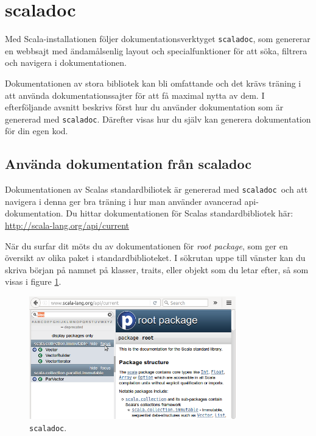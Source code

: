 \section{scaladoc}
\newcommand{\scaladoc}{\texttt{scaladoc}}

Med Scala-installationen följer dokumentationsverktyget \scaladoc, som genererar en webbsajt med ändamålsenlig layout och specialfunktioner för att söka, filtrera och navigera i dokumentationen. 

Dokumentationen av stora bibliotek kan bli omfattande och det krävs träning i att använda dokumentationssajter för att få maximal nytta av dem. I efterföljande avsnitt beskrivs först hur du använder dokumentation som är genererad med \scaladoc. Därefter visas hur du själv kan generera dokumentation för din egen kod.


\subsection{Använda dokumentation från scaladoc}

Dokumentationen av Scalas standardbiliotek är genererad med \scaladoc~och att navigera i denna ger bra träning i hur man använder avancerad api-dokumentation. Du hittar dokumentationen för Scalas standardbibliotek här: \\
\url{http://scala-lang.org/api/current} 


När du surfar dit möts du av dokumentationen för \textit{root package}, som ger en översikt av olika paket i standardbiblioteket. I sökrutan uppe till vänster kan du skriva början på namnet på klasser, traits, eller objekt som du letar efter, så som visas i figure \ref{fig:scaladoc:root-package}.

\begin{figure}[H]
\centering
\includegraphics[width=0.8\textwidth]{../img/scaladoc/scaladoc-root}

     \caption{ \scaladoc.}
    \label{fig:scaladoc:root-package}
\end{figure}

